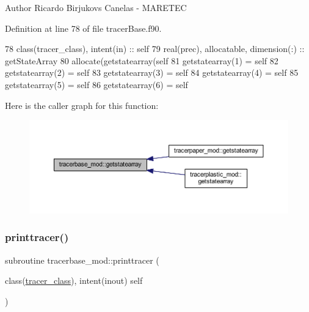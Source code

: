 \begin{DoxyAuthor}{Author}
Ricardo Birjukovs Canelas -\/ M\+A\+R\+E\+T\+EC 
\end{DoxyAuthor}


Definition at line 78 of file tracer\+Base.\+f90.


\begin{DoxyCode}
78     \textcolor{keywordtype}{class}(tracer\_class), \textcolor{keywordtype}{intent(in)} :: self
79     \textcolor{keywordtype}{real(prec)}, \textcolor{keywordtype}{allocatable}, \textcolor{keywordtype}{dimension(:)} :: getStateArray
80     \textcolor{keyword}{allocate}(getstatearray(self%
81     getstatearray(1) = self%
82     getstatearray(2) = self%
83     getstatearray(3) = self%
84     getstatearray(4) = self%
85     getstatearray(5) = self%
86     getstatearray(6) = self%
\end{DoxyCode}
Here is the caller graph for this function\+:\nopagebreak
\begin{figure}[H]
\begin{center}
\leavevmode
\includegraphics[width=350pt]{namespacetracerbase__mod_adbdd85bd57f1a9debbe7b682099afb1d_icgraph}
\end{center}
\end{figure}
\mbox{\label{namespacetracerbase__mod_ae320123e374df674769dbd48ba5ef46f}} 
\subsubsection{\texorpdfstring{printtracer()}{printtracer()}}
{\footnotesize\ttfamily subroutine tracerbase\+\_\+mod\+::printtracer (\begin{DoxyParamCaption}\item[{class(\mbox{\hyperlink{structtracerbase__mod_1_1tracer__class}{tracer\+\_\+class}}), intent(inout)}]{self }\end{DoxyParamCaption})\hspace{0.3cm}{\ttfamily [private]}}



